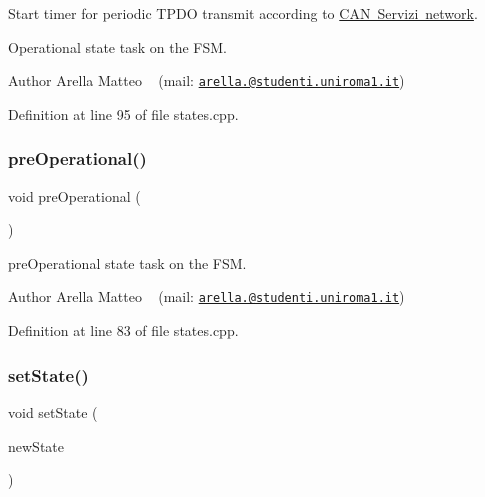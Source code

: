 Start timer for periodic T\+P\+DO transmit according to \mbox{\hyperlink{_c_a_n_network_page}{C\+AN Servizi network}}. 

Operational state task on the F\+SM.

\begin{DoxyAuthor}{Author}
Arella Matteo ~\newline
 (mail\+: \href{mailto:arella.1646983@studenti.uniroma1.it}{\tt arella.@studenti.\+uniroma1.\+it}) 
\end{DoxyAuthor}


Definition at line 95 of file states.\+cpp.

\mbox{\label{group___c_a_nopen___f_s_m__module_gaf9e8e3744244bcb2f8b6a8583c0bec0c}} 
\subsubsection{\texorpdfstring{pre\+Operational()}{preOperational()}}
{\footnotesize\ttfamily void pre\+Operational (\begin{DoxyParamCaption}{ }\end{DoxyParamCaption})}



pre\+Operational state task on the F\+SM. 

\begin{DoxyAuthor}{Author}
Arella Matteo ~\newline
 (mail\+: \href{mailto:arella.1646983@studenti.uniroma1.it}{\tt arella.@studenti.\+uniroma1.\+it}) 
\end{DoxyAuthor}


Definition at line 83 of file states.\+cpp.

\mbox{\label{group___c_a_nopen___f_s_m__module_ga47cb7615bbcf2c96cc4a7656f9a76bab}} 
\subsubsection{\texorpdfstring{set\+State()}{setState()}}
{\footnotesize\ttfamily void set\+State (\begin{DoxyParamCaption}\item[{\mbox{\hyperlink{group___c_a_nopen___f_s_m__module_ga5891f63a4c9243179838389a93d084e2}{e\+\_\+node\+State}}}]{new\+State }\end{DoxyParamCaption})}



